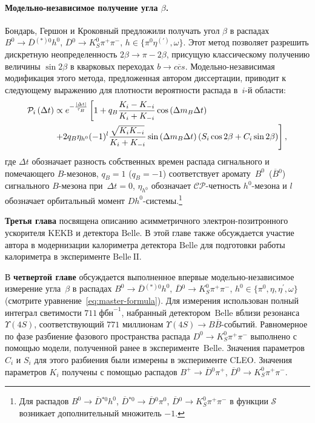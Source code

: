 \documentclass[a4paper,14pt]{extarticle} %
\newcommand{\dn}{\ensuremath{D^0}\xspace}
\newcommand{\bn}{\ensuremath{B^0}\xspace}
\newcommand{\hn}{\ensuremath{h^0}\xspace}
\newcommand{\dbar}{\ensuremath{\overline{D}}\xspace}
\newcommand{\bbar}{\ensuremath{\overline{B}}\xspace}
\newcommand{\bbbar}{\ensuremath{B\bbar}\xspace}
\newcommand{\dnbar}{\ensuremath{\dbar{}^0}\xspace}
\newcommand{\bnbar}{\ensuremath{\bbar{}^0}\xspace}
\newcommand{\dstnbar}{\ensuremath{\dbar{}^{*0}}\xspace}
\newcommand{\dstarnbar}{\ensuremath{\dbar{}^{(*)0}}\xspace}
\newcommand{\ks}{\ensuremath{K_S^0}\xspace}
\newcommand{\pin}{\ensuremath{\pi^0}\xspace}
\newcommand{\pphi}{\ensuremath{\beta}\xspace}
\newcommand{\sindbeta}{\ensuremath{\sin{2\pphi}}\xspace}
\newcommand{\cosdbeta}{\ensuremath{\cos{2\pphi}}\xspace}
\newcommand{\lbr}{\ensuremath{\left(}}
\newcommand{\rbr}{\ensuremath{\right)}}
\newcommand{\dnkpp}{\ensuremath{\dn\to\ks\pi^+\pi^-}\xspace}
\newcommand{\dbkpp}{\ensuremath{\dnbar\to\ks\pi^+\pi^-}\xspace}
\newcommand{\etap}{\ensuremath{\eta^{\prime}}\xspace}
\newcommand{\bdsth}{\ensuremath{\bn\to\dstarnbar\hn}\xspace}
\newcommand{\bdstarh}{\ensuremath{\bn\to\dstnbar\hn}\xspace}
\newcommand{\bpdpi}{\ensuremath{B^{+}\to\dnbar\pi^+}\xspace}
\newcommand{\dbstdbpi}{\ensuremath{\dbar{}^{*0}\to\dnbar\pin}\xspace}
\newcommand{\dt}{\ensuremath{\Delta t}\xspace}
\newcommand{\btoccs}{\ensuremath{b\to c\overline{c}s}\xspace}
\newcommand{\mcp}{\ensuremath{\mathcal{P}}\xspace}
\newcommand{\mcs}{\ensuremath{\mathcal{S}}\xspace}
\newcommand{\cpconj}{\ensuremath{\mathcal{CP}}\xspace}
\newcommand{\ups}{\ensuremath{\Upsilon\left(4S\right)}\xspace}
\newcommand{\ifb}{\ensuremath{~\textrm{фбн}^{-1}}\xspace}
\newcommand{\ki}{\ensuremath{K_i}\xspace}
\newcommand{\kmi}{\ensuremath{K_{-i}}\xspace}
\newcommand{\ci}{\ensuremath{C_i}\xspace}
\newcommand{\si}{\ensuremath{S_i}\xspace}
\newcommand{\dmb}{\ensuremath{\Delta m_B}\xspace}
\newcommand{\dmdt}{\ensuremath{\left(\dmb\dt\right)}\xspace}
\newcommand{\btau}{\ensuremath{\tau_B}\xspace}
\newcommand{\bexp}{\ensuremath{e^{-\frac{\left|\dt\right|}{\btau}}}\xspace}
\newcommand{\belle}{\ensuremath{\mathrm{Belle}}\xspace}
\newcommand{\belleii}{\ensuremath{\belle\:\mathrm{II}}\xspace}
\newcommand{\kekb}{\ensuremath{\mathrm{KEKB}}\xspace}
\begin{document}
\paragraph{\boldmath Модельно-независимое получение угла \pphi. }  Бондарь, Гершон и Кроковный предложили получать угол \pphi в распадах \bdsth, \dbkpp, $h\in\{\pin\eta^{(\prime)},\omega\}$.  Этот метод позволяет разрешить дискретную неопределенность $2\pphi\to\pi-2\pphi$, присущую классическому получению величины \sindbeta в кварковых переходах \btoccs.  Модельно-независимая модификация этого метода, предложенная автором диссертации, приводит к следующему выражению для плотности вероятности распада в~$i$-й области:
\begin{equation}\label{eq:master-formula}
 \begin{split}
  \mcp_i\lbr \dt\rbr &\propto \bexp\left[ 1 + q_B\frac{\ki-\kmi}{\ki+\kmi}\cos\dmdt\right.\\
  &\left.+2q_B\eta_{h^0}(-1)^l\frac{\sqrt{\ki\kmi}}{\ki+\kmi}\sin\dmdt\left(\si\cosdbeta+\ci\sindbeta\right)\right],
 \end{split}
 \end{equation} 
где $\dt$ обозначает разность собственных времен распада сигнального и помечающего $B$-мезонов, $q_B = 1$ ($q_B = -1$) соответствует аромату~\bn~(\bnbar) сигнального $B$-мезона при~$\dt=0$, $\eta_{h^0}$ обозначает \cpconj-четность $h^0$-мезона и $l$ обозначает орбитальный момент $Dh^0$-системы.\footnote{Для распадов \bdstarh, \dbstdbpi, \dbkpp в функции \mcs возникает дополнительный множитель $-1$.}  

{\textbf{Третья глава}} посвящена описанию асимметричного электрон-позитронного ускорителя \kekb и детектора \belle.  В этой главе также обсуждается участие автора в модернизации калориметра детектора \belle для подготовки работы калориметра в эксперименте \belleii.  

В {\textbf{четвертой главе}} обсуждается выполненное впервые модельно-независимое измерение угла~\pphi в распадах \bdsth, \dbkpp, $h^0\in\{\pin, \eta, \etap, \omega\}$ (смотрите уравнение~\eqref{eq:master-formula}).  Для измерения использован полный интеграл светимости $711\ifb$, набранный детектором~\belle вблизи резонанса~\ups, соответствующий $771$ миллионам $\ups\to\bbbar$-событий.  Равномерное по фазе разбиение фазового пространства распада \dnkpp выполнено с помощью модели, полученной ранее в эксперименте~\belle.  Значения параметров \ci и \si для этого разбиения были измерены в эксперименте CLEO.  Значения параметров \ki получены с помощью распадов \bpdpi, \dbkpp.
\end{document}
